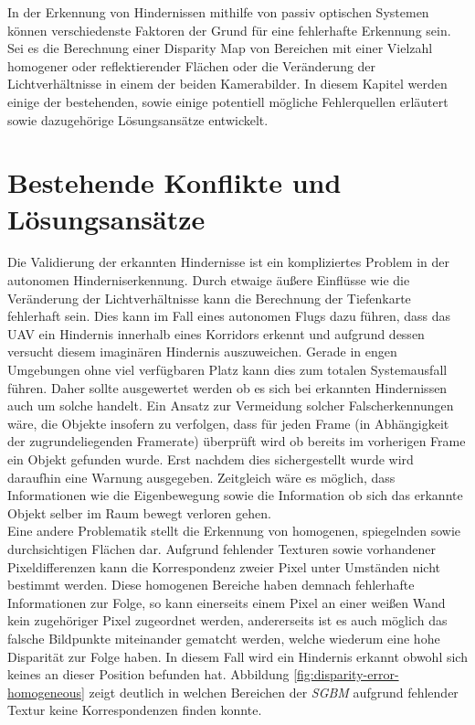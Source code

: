 In der Erkennung von Hindernissen mithilfe von passiv optischen Systemen können verschiedenste Faktoren der Grund für eine fehlerhafte Erkennung sein. Sei es die Berechnung einer Disparity Map von Bereichen mit einer Vielzahl homogener oder reflektierender Flächen oder die Veränderung der Lichtverhältnisse in einem der beiden Kamerabilder. In diesem Kapitel werden einige der bestehenden, sowie einige potentiell mögliche Fehlerquellen erläutert sowie dazugehörige Lösungsansätze entwickelt.\\


\section{Bestehende Konflikte und Lösungsansätze}
\label{sec:existing_conflicts}

Die Validierung der erkannten Hindernisse ist ein kompliziertes Problem in der autonomen Hinderniserkennung. Durch etwaige äußere Einflüsse wie die Veränderung der Lichtverhältnisse kann die Berechnung der Tiefenkarte fehlerhaft sein. Dies kann im Fall eines autonomen Flugs dazu führen, dass das UAV ein Hindernis innerhalb eines Korridors erkennt und aufgrund dessen versucht diesem imaginären Hindernis auszuweichen. Gerade in engen Umgebungen ohne viel verfügbaren Platz kann dies zum totalen Systemausfall führen. Daher sollte ausgewertet werden ob es sich bei erkannten Hindernissen auch um solche handelt. Ein Ansatz zur Vermeidung solcher Falscherkennungen wäre, die Objekte insofern zu verfolgen, dass für jeden Frame (in Abhängigkeit der zugrundeliegenden Framerate) überprüft wird ob bereits im vorherigen Frame ein Objekt gefunden wurde. Erst nachdem dies sichergestellt wurde wird daraufhin eine Warnung ausgegeben. Zeitgleich wäre es möglich, dass Informationen wie die Eigenbewegung sowie die Information ob sich das erkannte Objekt selber im Raum bewegt verloren gehen.\\

\noindent
Eine andere Problematik stellt die Erkennung von homogenen, spiegelnden sowie durchsichtigen Flächen dar. Aufgrund fehlender Texturen sowie vorhandener Pixeldifferenzen kann die Korrespondenz zweier Pixel unter Umständen nicht bestimmt werden. Diese homogenen Bereiche haben demnach fehlerhafte Informationen zur Folge, so kann  einerseits einem Pixel an einer weißen Wand kein zugehöriger Pixel zugeordnet werden, andererseits ist es auch möglich das falsche Bildpunkte miteinander gematcht werden, welche wiederum eine hohe Disparität zur Folge haben. In diesem Fall wird ein Hindernis erkannt obwohl sich keines an dieser Position befunden hat. Abbildung \ref{fig:disparity-error-homogeneous} zeigt deutlich in welchen Bereichen der \emph{SGBM} aufgrund fehlender Textur keine Korrespondenzen finden konnte.\\

